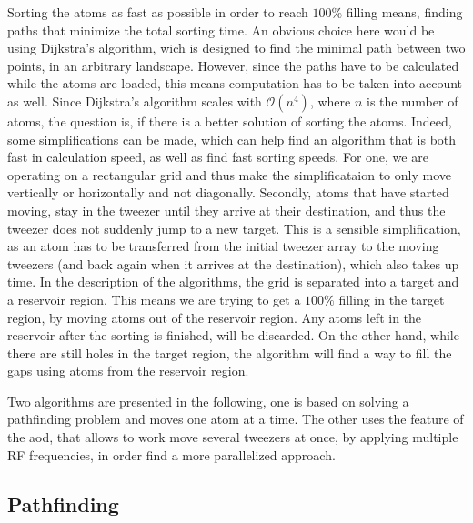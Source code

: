 Sorting the atoms as fast as possible in order to reach $100\%$ filling means, finding paths that minimize the total sorting time. An obvious choice here would be using Dijkstra's algorithm, wich is designed to find the minimal path between two points, in an arbitrary landscape. However, since the paths have to be calculated while the atoms are loaded, this means computation has to be taken into account as well. Since Dijkstra's algorithm scales with $\mathcal{O}(n^4)$, where $n$ is the number of atoms, the question is, if there is a better solution of sorting the atoms. Indeed, some simplifications can be made, which can help find an algorithm that is both fast in calculation speed, as well as find fast sorting speeds.
For one, we are operating on a rectangular grid and thus make the simplificataion to only move vertically or horizontally and not diagonally. Secondly, atoms that have started moving, stay in the tweezer until they arrive at their destination, and thus the tweezer does not suddenly jump to a new target. This is a sensible simplification, as an atom has to be transferred from the initial tweezer array to the moving tweezers (and back again when it arrives at the destination), which also takes up time. In the description of the algorithms, the grid is separated into a target and a reservoir region. This means we are trying to get a $100\%$ filling in the target region, by moving atoms out of the reservoir region. Any atoms left in the reservoir after the sorting is finished, will be discarded. On the other hand, while there are still holes in the target region, the algorithm will find a way to fill the gaps using atoms from the reservoir region.

Two algorithms are presented in the following, one is based on solving a pathfinding problem and moves one atom at a time. The other uses the feature of the \ac{aod}, that allows to work move several tweezers at once, by applying multiple RF frequencies, in order find a more parallelized approach.


\subsection{Pathfinding}

